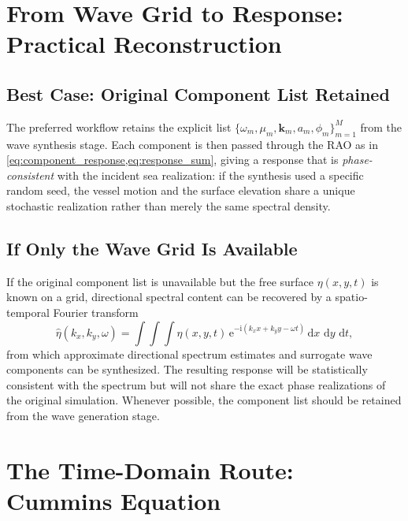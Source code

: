 \documentclass[journal,10pt,twocolumn]{IEEEtran}
\newcommand{\dd}{\,\mathrm{d}}
\newcommand{\ii}{\mathrm{i}}
\newcommand{\ee}{\mathrm{e}}
\newcommand{\vect}[1]{\bm{#1}}
\begin{document}
    \section{From Wave Grid to Response: Practical Reconstruction}
    \label{sec:reconstruction}

    \subsection{Best Case: Original Component List Retained}
    \label{sec:bestcase}

    The preferred workflow retains the explicit list
    $\{\omega_m,\mu_m,\vect{k}_m,a_m,\phi_m\}_{m=1}^{M}$
    from the wave synthesis stage.
    Each component is then passed through the RAO as in
    \cref{eq:component_response,eq:response_sum}, giving a response that is
    \emph{phase-consistent} with the incident sea realization: if the synthesis used a
    specific random seed, the vessel motion and the surface elevation share a unique
    stochastic realization rather than merely the same spectral density.

    \subsection{If Only the Wave Grid Is Available}
    \label{sec:gridrec}

    If the original component list is unavailable but the free surface $\eta(x,y,t)$ is
    known on a grid, directional spectral content can be recovered by a spatio-temporal
    Fourier transform
    \begin{equation}
        \hat{\eta}(k_x,k_y,\omega)
        = \int\!\!\int\!\!\int
        \eta(x,y,t)\,
        \ee^{-\ii(k_x x+k_y y-\omega t)}\dd x\,\dd y\,\dd t,
    \end{equation}
    from which approximate directional spectrum estimates and surrogate wave components can
    be synthesized.
    The resulting response will be statistically consistent with the spectrum but will not
    share the exact phase realizations of the original simulation.
    Whenever possible, the component list should be retained from the wave generation stage.

    \section{The Time-Domain Route: Cummins Equation}
    \label{sec:cummins}
\end{document}
